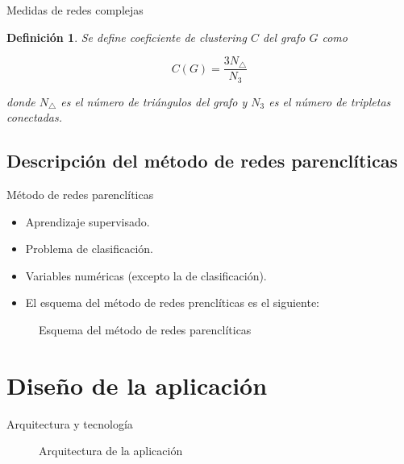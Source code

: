 \documentclass[hyperref={unicode}]{beamer}
\newtheorem{defi}{\textbf{\color{ExecusharesBlue}Definición}}
\begin{document}
\begin{frame}{Medidas de redes complejas}
	\begin{defi}
	Se define coeficiente de clustering $C$ del grafo $G$ como
			
			\begin{equation}\label{eq:clustering}
			C(G) = \dfrac{3N_{\triangle}}{N_3}
			\end{equation}
			
			donde $N_{\triangle}$ es el número de triángulos del grafo y $N_3$ es el número de tripletas conectadas.
	\end{defi}
\end{frame}

\subsection{Descripción del método de redes parenclíticas}
\begin{frame}{Método de redes parenclíticas}
	\begin{itemize}
	\item Aprendizaje supervisado.
	\item Problema de clasificación.
	\item Variables numéricas (excepto la de clasificación).
	\item El esquema del método de redes prenclíticas es el siguiente:
	\end{itemize}
	
	\begin{figure}[htbp!]
		\begin{center}
			\resizebox{\textwidth}{!}{%
				\redesparencliticas
			}
		\end{center}
		\caption{Esquema del método de redes parenclíticas}
		\label{fig:redesparencliticas}
	\end{figure}
\end{frame}



\section{Diseño de la aplicación}
\begin{frame}{Arquitectura y tecnología}
	\begin{figure}[htbp!]
		\centering
		\arquitectura
		\caption{Arquitectura de la aplicación}
		\label{fig:arquitectura}
	\end{figure}
\end{frame}
\end{document}
